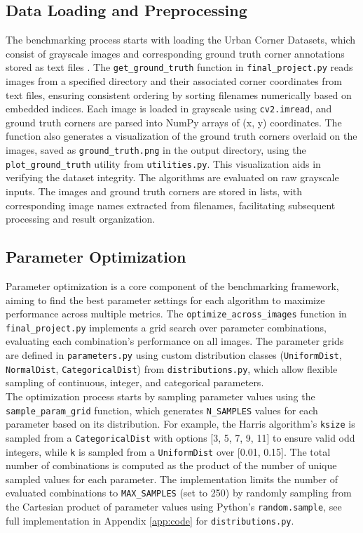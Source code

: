 \documentclass[journal]{IEEEtran}
\begin{document}
\subsection{Data Loading and Preprocessing}
The benchmarking process starts with loading the Urban Corner Datasets, which consist of grayscale images and corresponding ground truth corner annotations stored as text files \cite{Urban_Corner_Dataset}. The \texttt{get\_ground\_truth} function in \texttt{final\_project.py} reads images from a specified directory and their associated corner coordinates from text files, ensuring consistent ordering by sorting filenames numerically based on embedded indices. Each image is loaded in grayscale using \texttt{cv2.imread}, and ground truth corners are parsed into NumPy arrays of (x, y) coordinates. The function also generates a visualization of the ground truth corners overlaid on the images, saved as \texttt{ground\_truth.png} in the output directory, using the \texttt{plot\_ground\_truth} utility from \texttt{utilities.py}. This visualization aids in verifying the dataset integrity. The algorithms are evaluated on raw grayscale inputs. The images and ground truth corners are stored in lists, with corresponding image names extracted from filenames, facilitating subsequent processing and result organization.\\

\subsection{Parameter Optimization}
Parameter optimization is a core component of the benchmarking framework, aiming to find the best parameter settings for each algorithm to maximize performance across multiple metrics. The \texttt{optimize\_across\_images} function in \texttt{final\_project.py} implements a grid search over parameter combinations, evaluating each combination’s performance on all images. The parameter grids are defined in \texttt{parameters.py} using custom distribution classes (\texttt{UniformDist}, \texttt{NormalDist}, \texttt{CategoricalDist}) from \texttt{distributions.py}, which allow flexible sampling of continuous, integer, and categorical parameters.\\

The optimization process starts by sampling parameter values using the \texttt{sample\_param\_grid} function, which generates \texttt{N\_SAMPLES} values for each parameter based on its distribution. For example, the Harris algorithm’s \texttt{ksize} is sampled from a \texttt{CategoricalDist} with options [3, 5, 7, 9, 11] to ensure valid odd integers, while \texttt{k} is sampled from a \texttt{UniformDist} over [0.01, 0.15]. The total number of combinations is computed as the product of the number of unique sampled values for each parameter. The implementation limits the number of evaluated combinations to \texttt{MAX\_SAMPLES} (set to 250) by randomly sampling from the Cartesian product of parameter values using Python's \texttt{random.sample}, see full implementation in Appendix \ref{app:code} for \texttt{distributions.py}.\\
\end{document}
